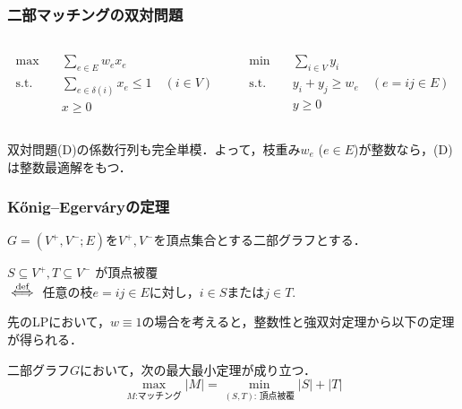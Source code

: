 \documentclass[14pt,aspectratio=169,xcolor=dvipsnames,table,onlytextwidth,dvipdfmx]{beamer}
\begin{document}
\begin{frame}
    \frametitle{二部マッチングの双対問題}
    \small

    \begin{columns}[T]
    \begin{column}{.45\textwidth}
    \begin{primal}
        \setlength{\abovedisplayskip}{0pt}
        \begin{alignat*}{2}
            \text{max} & \quad  \sum_{e \in E} w_e x_e \\
            \text{s.t.} & \quad \sum_{e \in \delta(i)} x_e \leq 1  \quad (i \in V) \\
            & \quad x \geq 0 
        \end{alignat*}
    \end{primal}
    \end{column}
    \begin{column}{.45\textwidth}
    \begin{dual}
        \setlength{\abovedisplayskip}{0pt}
        \begin{alignat*}{2}
            \text{min} & \quad  \sum_{i \in V} y_i \\
            \text{s.t.} & \quad y_i + y_j \geq w_e \quad (e=ij \in E) \\
            & \quad y \geq 0
        \end{alignat*}
    \end{dual}
    \end{column}
    \end{columns}

    \vfill
    双対問題(D)の係数行列も完全単模．よって，枝重み$w_e$ ($e \in E$)が整数なら，(D)は整数最適解をもつ．
\end{frame}

\begin{frame}
    \frametitle{K\H{o}nig--Egerv\'aryの定理}

    $G = (V^+, V^-; E)$を$V^+, V^-$を頂点集合とする二部グラフとする．

    \begin{definition}
        $S \subseteq V^+, T \subseteq V^-$ が\alert{頂点被覆} \\
        $\overset{\text{def}}{\iff}$ 任意の枝$e = ij \in E$に対し，$i \in S$または$j \in T$.
    \end{definition}

    \pause\vfill
    先のLPにおいて，$w \equiv 1$の場合を考えると，整数性と強双対定理から以下の定理が得られる．

    \begin{theorem}
        二部グラフ$G$において，次の最大最小定理が成り立つ．
        \[
            \max_{\text{$M$:マッチング}} |M| = \min_{\text{$(S,T)$: 頂点被覆}} |S| + |T|
        \]
    \end{theorem}
\end{frame}
\end{document}
